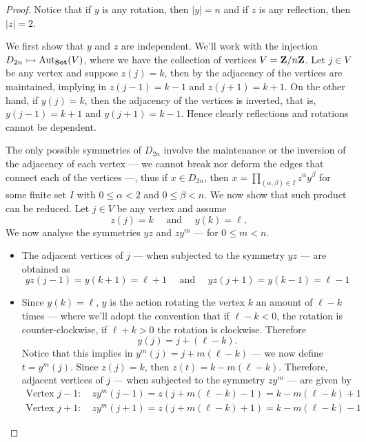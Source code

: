 \begin{proof}
Notice that if \(y\) is any rotation, then \(|y| = n\) and if \(z\) is any
reflection, then \(|z| = 2\).

We first show that \(y\) and \(z\) are independent. We'll work with the
injection \(D_{2n} \rightarrowtail \operatorname{Aut}_{\textbf{Set}}(V)\), where we have the collection of
vertices \(V = \mathbf{Z}/n\mathbf{Z}\). Let \(j \in V\) be any vertex and suppose \(z(j) =
k\), then by the adjacency of the vertices are maintained, implying in \(z(j -
1) = k - 1\) and \(z(j + 1) = k + 1\). On the other hand, if \(y(j) = k\),
then the adjacency of the vertices is inverted, that is, \(y(j - 1) = k + 1\)
and \(y(j + 1) = k - 1\). Hence clearly reflections and rotations cannot be
dependent.

The only possible symmetries of \(D_{2n}\) involve the maintenance or the
inversion of the adjacency of each vertex --- we cannot break nor deform the
edges that connect each of the vertices ---, thus if \(x \in D_{2n}\), then
\(x = \prod_{(\alpha, \beta) \in I} z^\alpha y^\beta\) for some finite set
\(I\) with \(0 \leq \alpha < 2\) and \(0 \leq \beta < n\). We now show that such
product can be reduced. Let \(j \in V\) be any vertex and assume
\[
  z(j) = k
  \quad\text{ and }\quad
  y(k) = \ell,
\]
We now analyse the symmetries \(y z\) and \(z y^m\) --- for \(0 \leq m < n\).
\begin{itemize}
  \item The adjacent vertices of \(j\) --- when subjected to the symmetry \(y
    z\) --- are obtained as
    \[
      y z(j - 1) = y(k + 1) = \ell + 1
      \quad\text{ and }\quad
      y z(j + 1) = y(k - 1) = \ell - 1
    \]
  \item Since \(y(k) = \ell\), \(y\) is the action rotating the vertex \(k\)
    an amount of \(\ell - k\) times  --- where we'll adopt the convention that
    if \(\ell - k < 0\), the rotation is counter-clockwise, if \(\ell + k >
    0\) the rotation is clockwise. Therefore
    \[
      y(j) = j + (\ell - k).
    \]
    Notice that this implies in \(y^m(j) = j + m(\ell - k)\) --- we now define
    \(t = y^m(j)\). Since \(z(j) = k\), then \(z(t) = k - m(\ell - k)\).
    Therefore, adjacent vertices of \(j\) --- when subjected to the symmetry
    \(z y^m\) --- are given by
    \begin{gather*}
      \text{Vertex } j - 1: \quad
      z y^m(j - 1) = z(j + m (\ell - k) - 1) = k - m(\ell - k) + 1 \\
      \text{Vertex } j + 1: \quad
      z y^m(j + 1) = z(j + m (\ell - k) + 1) = k - m (\ell - k) - 1

\end{gather*}
\end{itemize}
\end{proof}
